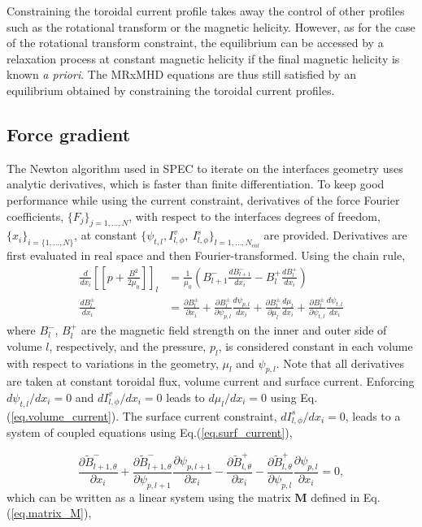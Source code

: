 Constraining the toroidal current profile takes away the control of other profiles such as the rotational transform or the magnetic helicity. However, as for the case of the rotational transform constraint, the equilibrium can be accessed by a relaxation process at constant magnetic helicity if the final magnetic helicity is known \textit{a priori}. The \ac{MRxMHD} equations are thus still satisfied by an equilibrium obtained by constraining the toroidal current profiles. 

\subsection{Force gradient}

The Newton algorithm used in SPEC to iterate on the interfaces geometry uses analytic derivatives, which is faster than finite differentiation. To keep good performance while using the current constraint, derivatives of the force Fourier coefficients, $\{F_j\}_{j=1,\ldots,N}$, with respect to the interfaces degrees of freedom, $\{x_i\}_{i=\{1,\ldots,N\}}$, at constant $\{\psi_{t,l}, I^v_{l,\phi},\ I^s_{l,\phi}\}_{l=1,\ldots,N_{vol}}$ are provided. Derivatives are first evaluated in real space and then Fourier-transformed. Using the chain rule,
\begin{align}
    \frac{d}{d x_i}\left[\left[p + \frac{B^2}{2\mu_0}\right]\right]_l &= \frac{1}{\mu_0}\left( B^-_{l+1}\frac{d B^-_{l+1}}{d x_i} - B^+_l \frac{d B^+_{l}}{d x_i}\right)\\ \label{eq.force_gradient}
    \frac{d B^{\pm}_l}{d x_i} &= \frac{\partial B^\pm_l}{\partial x_i} + \frac{\partial B^\pm_l}{\partial \psi_{p,l}}\frac{d \psi_{p,l}}{d x_i} + \frac{\partial B^\pm_l}{\partial \mu_l}\frac{d\mu_l}{d x_i}+ \frac{\partial B^\pm_l}{\partial \psi_{t,l}}\frac{d\psi_{t,l}}{d x_i}
\end{align}
where $B^-_l$, $B^+_l$ are the magnetic field strength on the inner and outer side of volume $l$, respectively, and the pressure, $p_l$, is considered constant in each volume with respect to variations in the geometry, $\mu_l$ and $\psi_{p,l}$. Note that all derivatives are taken at constant toroidal flux, volume current and surface current. Enforcing $ d\psi_{t,l} / dx_i=0$ and $d I^v_{l,\phi} / dx_i=0$ leads to $d \mu_l/dx_i=0$ using Eq.(\ref{eq.volume_current}). The surface current constraint, $d I^s_{l,\phi}/dx_i=0$, leads to a system of coupled equations using Eq.(\ref{eq.surf_current}),
     
\begin{equation}
    \frac{\partial \tilde{B}^-_{l+1,\theta}}{\partial x_i} + \frac{\partial \tilde{B}^-_{l+1,\theta}}{\partial \psi_{p,l+1}} \frac{\partial\psi_{p,l+1}}{\partial x_i} - \frac{\partial \tilde{B}^+_{l,\theta}}{\partial x_i} - \frac{\partial \tilde{B}^+_{l,\theta}}{\partial \psi_{p,l}}\frac{\partial\psi_{p,l}}{\partial x_i} = 0, \label{eq.Isurface_derivative}
\end{equation}
which can be written as a linear system using the matrix $\mathbf{M}$ defined in Eq.(\ref{eq.matrix_M}),
     

